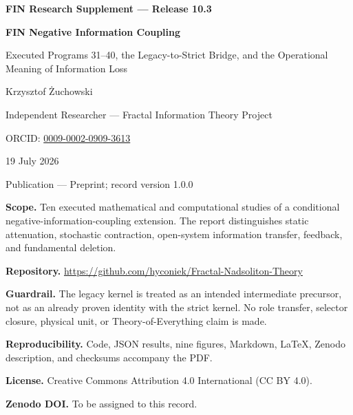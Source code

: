 \documentclass[11pt,a4paper,openany]{report}
\begin{document}
\hypersetup{pageanchor=false}
\begin{titlepage}
\centering
\vspace*{10mm}
{\Large\bfseries FIN Research Supplement --- Release 10.3\par}
\vspace{11mm}
{\Huge\bfseries FIN Negative Information Coupling\par}
\vspace{6mm}
{\Large Executed Programs 31--40, the Legacy-to-Strict Bridge, and the Operational Meaning of Information Loss\par}
\vspace{17mm}
{\Large Krzysztof Żuchowski\par}
\vspace{2mm}
{\normalsize Independent Researcher --- Fractal Information Theory Project\par}
\vspace{2mm}
{\normalsize ORCID: \href{https://orcid.org/0009-0002-0909-3613}{0009-0002-0909-3613}\par}
\vspace{10mm}
{\large 19 July 2026\par}
{\normalsize Publication --- Preprint; record version 1.0.0\par}
\vfill
\begin{minipage}{0.88\textwidth}
\small
\textbf{Scope.} Ten executed mathematical and computational studies of a conditional negative-information-coupling extension. The report distinguishes static attenuation, stochastic contraction, open-system information transfer, feedback, and fundamental deletion.

\medskip
\textbf{Repository.} \url{https://github.com/hyconiek/Fractal-Nadsoliton-Theory}

\textbf{Guardrail.} The legacy kernel is treated as an intended intermediate precursor, not as an already proven identity with the strict kernel. No role transfer, selector closure, physical unit, or Theory-of-Everything claim is made.

\textbf{Reproducibility.} Code, JSON results, nine figures, Markdown, LaTeX, Zenodo description, and checksums accompany the PDF.

\textbf{License.} Creative Commons Attribution 4.0 International (CC BY 4.0).

\textbf{Zenodo DOI.} To be assigned to this record.
\end{minipage}
\vfill
\end{titlepage}
\hypersetup{pageanchor=true}
\end{document}
